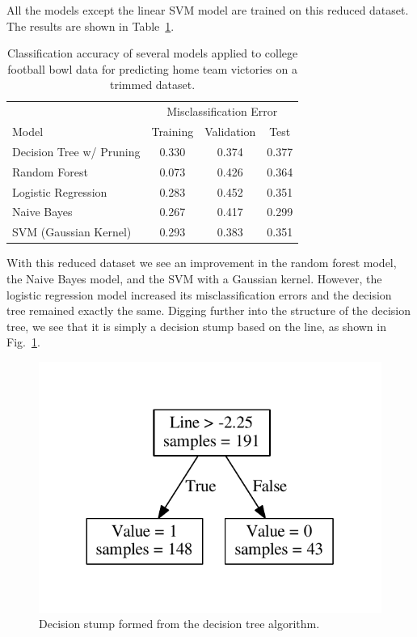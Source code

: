 \documentclass[12pt]{article}
\begin{document}
All the models except the linear SVM model are trained on this reduced dataset. The results are shown in Table~\ref{tab::try_1_reduced}.
\begin{table}[ht!]
	\begin{center}
		\caption{Classification accuracy of several models applied to college football bowl data for predicting home team victories on a trimmed dataset.}
		\label{tab::try_1_reduced}
		\begin{tabular}{l|ccc}
			\hline
			& \multicolumn{3}{c}{Misclassification Error} \\
			Model & Training & Validation & Test \\
			\hline
			Decision Tree w/ Pruning & 0.330 & 0.374 & 0.377\\
			Random Forest & 0.073 & 0.426 & 0.364\\
			Logistic Regression & 0.283 & 0.452 & 0.351\\
			Naive Bayes & 0.267 & 0.417 & 0.299\\
			SVM (Gaussian Kernel) & 0.293 & 0.383 & 0.351\\
			\hline
		\end{tabular}
	\end{center}
\end{table}
With this reduced dataset we see an improvement in the random forest model, the Naive Bayes model, and the SVM with a Gaussian kernel. However, the logistic regression model increased its misclassification errors and the decision tree remained exactly the same. Digging further into the structure of the decision tree, we see that it is simply a decision stump based on the line, as shown in Fig.~\ref{fig::stump}.

\begin{figure}[h!]
	\begin{center}
		\includegraphics[scale=0.8]{figs/stump.pdf}
	\end{center}
	\caption{Decision stump formed from the decision tree algorithm.}
	\label{fig::stump}
\end{figure}
\end{document}
